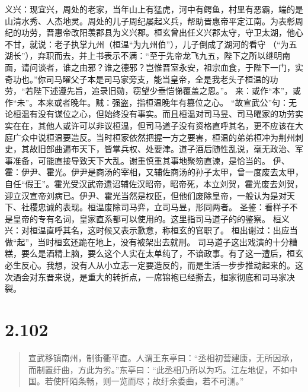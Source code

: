 \documentclass[]{book}
\begin{document}
义兴：现宜兴，周处的老家，当年山上有猛虎，河中有鳄鱼，村里有恶霸，端的是山清水秀、人杰地灵。周处的儿子周纪屡起义兵，帮助晋惠帝平定江南。为表彰周纪的功劳，晋惠帝改阳羡郡县为义兴郡。桓玄曾出任义兴郡太守，守卫太湖，他心不甘，就说：老子执掌九州（桓温``为九州伯''），儿子倒成了湖河的看守
（``为五湖长''），弃职而去，并上书表示不满：``至于先帝龙飞九五，陛下之所以继明南面，请问谈者，谁之由邪？谁之德邪？岂惟晋室永安，祖宗血食，于陛下一门，实奇功也。''你司马曜父子本是司马家旁支，能当皇帝，全是我老头子桓温的功劳，``若陛下述遵先旨，追录旧勋，窃望少垂恺悌覆盖之恩。''。
来：或作``本''，或作``未''。本来或者晚年。贼：强盗，指桓温晚年有篡位之心。
``故宣武公''句：无论桓温有没有谋位之心，但始终没有事实。而且桓温对司马昱、司马曜家的功劳实实在在，其他人或许可以非议桓温，但司马道子没有资格直呼其名，更不应该在大庭广众中说桓温要造反。当时桓家依然把握一方之要害，桓温的弟弟桓冲为荆州刺史，其故旧部曲遍布天下，皆掌兵权、处要津。道子酒后随性乱说，毫无政治、军事准备，可能直接导致天下大乱。谢重慎重其事地聚笏直谏，是恰当的。
伊、霍：伊尹、霍光。伊尹是商汤的宰相，又辅佐商汤的孙子太甲，曾一度废去太甲，自任``假王''。霍光受汉武帝遗诏辅佐汉昭帝，昭帝死，本立刘贺，霍光废去刘贺，迎立汉宣帝刘病已。伊尹、霍光当然是权臣，但他们废除皇帝，一般认为是对天下、社稷忠诚的表现。桓温废除司马弈，立司马昱，形同两者。
圣鉴：看样子不是皇帝的专有名词，皇家直系都可以使用的。这里指司马道子的的鉴察。
桓义兴：对桓温直呼其名，这时候又表示歉意，称桓玄的官职了。
桓出谢过：出应当做``起''，当时桓玄还跪在地上，没有被架出去就刑。
司马道子这出戏演的十分糟糕，要么是酒精上脑，要么这个人实在太单纯了，不谙政事。有了这一遭后，桓玄必生反心。我想，没有人从小立志一定要造反的，而是生活一步步推动起来的。这次酒会对东晋来说，是重大的转折点，一席锦袍已经撕去，桓家彻底和司马家决裂。

\section{2.102}\label{section-148}

\begin{quote}
宣武移镇南州，制街衢平直。人谓王东亭曰：``丞相初营建康，无所因承，而制置纡曲，方此为劣。''东亭曰：``此丞相乃所以为巧。江左地促，不如中国。若使阡陌条畅，则一览而尽；故纡余委曲，若不可测。''
\end{quote}
\end{document}
